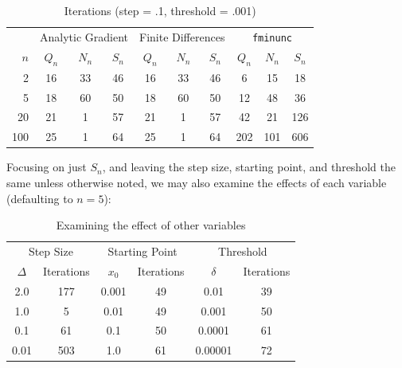 \documentclass[11pt,letterpaper]{article}
\begin{document}
\begin{table}[h]
\centering
\caption{Iterations (step = .1, threshold = .001)}
\begin{tabular}{r|ccc|ccc|ccc}
   & \multicolumn{3}{|c}{Analytic Gradient} & \multicolumn{3}{|c}{Finite Differences} & \multicolumn{3}{|c}{\texttt{fminunc}} \\
$n$& $Q_n$         & $N_n$        & $S_n$   & $Q_n$              & $N_n$   & $S_n$           & $Q_n$         & $N_n$        & $S_n$ \\\hline
2  & 16            & 33           & 46      & 16                 & 33      & 46              & 6             & 15           & 18    \\
5  & 18            & 60           & 50      & 18                 & 60      & 50              & 12            & 48           & 36    \\
20 & 21            &  1           & 57      & 21                 &  1      & 57              & 42            & 21           & 126   \\
100& 25            &  1           & 64      & 25                 &  1      & 64              & 202           & 101          & 606   
\end{tabular}
\end{table}

Focusing on just $S_n$, and leaving the step size, starting point, and threshold the same unless otherwise noted, we may also examine the effects of each variable (defaulting to $n=5$):

\begin{table}[h]
\centering
\caption{Examining the effect of other variables}
\begin{tabular}{cc|cc|cc}
\multicolumn{2}{c}{Step Size}& \multicolumn{2}{|c}{Starting Point} & \multicolumn{2}{|c}{Threshold} \\
$\Delta$  & Iterations        & $x_0$   & Iterations   & $\delta$  & Iterations     \\\hline
2.0       & 177               & 0.001   & 49           & 0.01      & 39     \\
1.0       & 5                 & 0.01    & 49           & 0.001     & 50     \\
0.1       & 61                & 0.1     & 50           & 0.0001    & 61     \\
0.01      & 503               & 1.0     & 61           & 0.00001   & 72  
\end{tabular}
\end{table}
\end{document}
